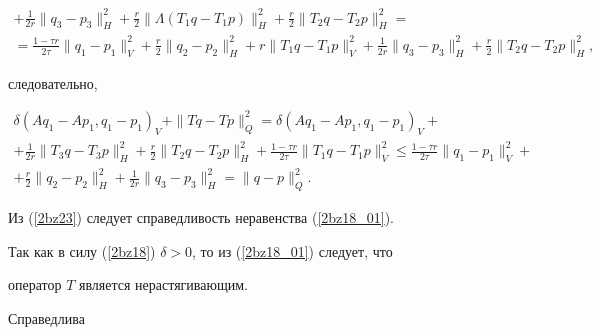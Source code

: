 \begin{pf}
\begin{multline*}
%


+ \frac {1} {2 r} \| {q_3-p_3} \|_H^2+


\frac {r} {2} \| {\Lambda (T_1 q-T_1 p)} \|_H^2+


\frac {r} {2} \| {T_2 q-T_2 p} \|_H^2= \\


%


= \frac {1-\tau r} {2 \tau} \| {q_1-p_1} \|_V^2+


\frac {r} {2} \| {q_2-p_2} \|_H^2+


r \| {T_1 q-T_1 p} \|_V^2+ 


\frac {1} {2 r} \| {q_3-p_3} \|_H^2+


\frac {r} {2} \| {T_2 q-T_2 p} \|_H^2,


\end{multline*}


следовательно,


\begin{multline}


\delta (A q_1-A p_1, q_1-p_1)_V+\| {T q-T p} \|_Q^2=


\delta (A q_1-A p_1, q_1-p_1)_V+ \\


+ \frac {1} {2 r} \| {T_3 q-T_3 p} \|_H^2+


\frac {r} {2} \| {T_2 q-T_2 p} \|_H^2+ 


\frac {1-\tau r} {2 \tau} \| {T_1 q-T_1 p} \|_V^2 \leq


\frac {1-\tau r} {2 \tau} \| {q_1-p_1} \|_V^2+ \\


%


+\frac {r} {2} \| {q_2-p_2} \|_H^2+


\frac {1} {2 r} \| {q_3-p_3} \|_H^2=\| { q- p} \|_Q^2.


\label{2bz23}


\end{multline}


Из (\ref{2bz23}) следует справедливость неравенства (\ref{2bz18_01}).


Так как в силу (\ref{2bz18}) $\delta > 0$, то из (\ref{2bz18_01}) следует, что


оператор $T$ является нерастягивающим. 


\end{pf}





Справедлива





